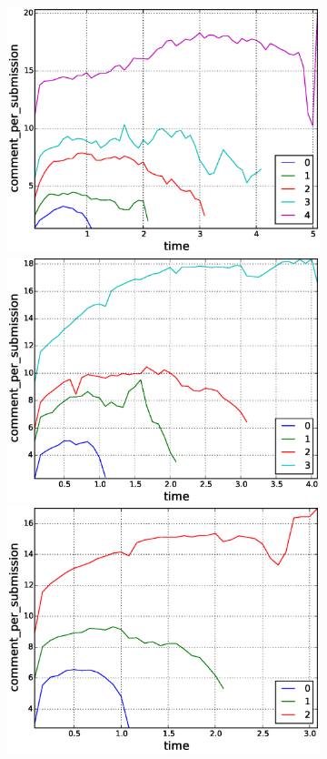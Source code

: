 \begin{figure}[!tb]
\begin{subfigure}{1\textwidth}
    \includegraphics[scale=0.285]{./images/comments_per_submissions_for_surviving_year_for_2010.eps}
    \includegraphics[scale=0.285]{./images/comments_per_submissions_for_surviving_year_for_2011.eps}
    \includegraphics[scale=0.285]{./images/comments_per_submissions_for_surviving_year_for_2012.eps}

\end{subfigure}
\end{figure}
